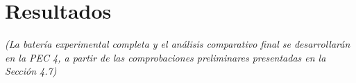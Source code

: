 \clearpage
\section{Resultados}

\textit{(La batería experimental completa y el análisis comparativo final se desarrollarán en la PEC 4, a partir de las comprobaciones preliminares presentadas en la Sección 4.7)}

